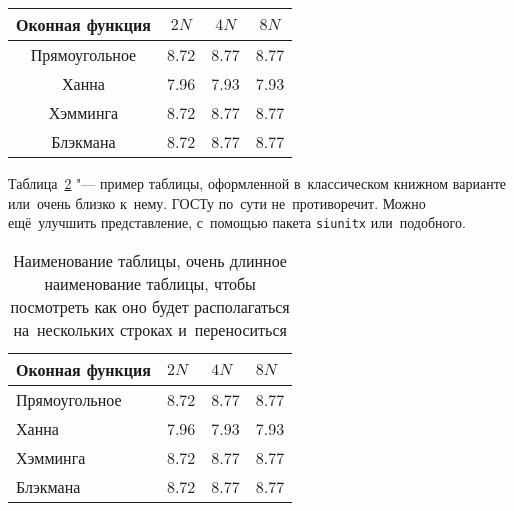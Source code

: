 \begin{table} [htbp]%
    \centering
    \begin{threeparttable}%
        \caption{}%
        \label{tab:test1}%
        \begin{SingleSpace}
            \begin{tabular}{| c | c | c | c |}
                \hline
                Оконная функция & \({2N}\) & \({4N}\) & \({8N}\) \\ \hline
                Прямоугольное   & 8.72     & 8.77     & 8.77     \\ \hline
                Ханна           & 7.96     & 7.93     & 7.93     \\ \hline
                Хэмминга        & 8.72     & 8.77     & 8.77     \\ \hline
                Блэкмана        & 8.72     & 8.77     & 8.77     \\ \hline
            \end{tabular}%
        \end{SingleSpace}
    \end{threeparttable}
\end{table}

Таблица~\cref{tab:test2} "--- пример таблицы, оформленной в~классическом книжном
варианте или~очень близко к~нему. \mbox{ГОСТу} по~сути не~противоречит. Можно
ещё~улучшить представление, с~помощью пакета \verb|siunitx| или~подобного.

\begin{table} [htbp]%
    \centering
    \caption{Наименование таблицы, очень длинное наименование таблицы, чтобы посмотреть как оно будет располагаться на~нескольких строках и~переноситься}%
    \label{tab:test2}%
    \renewcommand{\arraystretch}{1.5}%
    \begin{SingleSpace}
        \begin{tabular}{@{}@{\extracolsep{20pt}}llll@{}} %
            \toprule     %
            Оконная функция & \({2N}\) & \({4N}\) & \({8N}\) \\
            \midrule %
            Прямоугольное   & 8.72     & 8.77     & 8.77     \\
            Ханна           & 7.96     & 7.93     & 7.93     \\
            Хэмминга        & 8.72     & 8.77     & 8.77     \\
            Блэкмана        & 8.72     & 8.77     & 8.77     \\
            \bottomrule %
        \end{tabular}%
    \end{SingleSpace}
\end{table}

